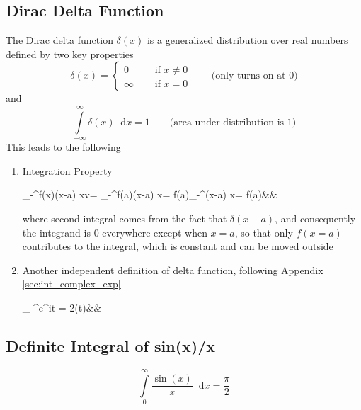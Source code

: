 \documentclass[11pt, a4paper]{article}
\newcommand{\diff}{\mathop{}\!\mathrm{d}}
\newcommand{\dx}{\diff x}
\newcommand{\domega}{\diff \omega}
\newcommand{\dint}[2]{\int \limits_{#1}^{#2}}  %
\newcommand{\intinfty}{\dint{-\infty}{\infty}}	%
\newcommand{\intzerotoinfty}{\dint{0}{\infty}}	%
\begin{document}
\subsection{Dirac Delta Function}\label{sec:delta_func}
The Dirac delta function $\delta(x)$ is a generalized distribution over real numbers defined by two key properties \cite{dirac1981qm}
\begin{equation}\label{eq:delta_func_def}
	\delta (x) = \left\{
	\begin{array}{ll}
		0  &  \quad \text{ if } x \neq 0 \\
		\infty & \quad \text{ if } x = 0
	\end{array}
	\right. \qquad \text{(only turns on at $0$)}
\end{equation}
and
\begin{equation}\label{eq:delta_func_area}
	\intinfty \delta (x) \dx = 1 \qquad \text{(area under distribution is $1$)}
\end{equation}
This leads to the following
\begin{enumerate}
	\item Integration Property
	\begin{flalign}\label{eq:delta_func_integration_value}
		\intinfty f(x)\delta (x-a) \dx v= \intinfty f(a)\delta (x-a) \dx = f(a)\intinfty \delta (x-a) \dx = f(a)&&
	\end{flalign}
	where second integral comes from the fact that $\delta (x - a)$, and consequently the integrand is $0$ everywhere except when $x=a$, so that only $f(x=a)$ contributes to the integral, which is constant and can be moved outside
	\item Another independent definition of delta function, following Appendix \ref{sec:int_complex_exp}
	\begin{flalign}\label{eq:delta_func_def_complex_exp}
		\intinfty e^{i\omega t} \domega = 2\pi \delta (t)&&
	\end{flalign}
\end{enumerate}

\subsection{Definite Integral of sin(x)/x}\label{sec:int_sinx_by_x}
\begin{equation}\label{eq:int_sinx_by_x}
\intzerotoinfty \frac{\sin(x)}{x} \dx = \frac{\pi}{2}
\end{equation}
\end{document}

